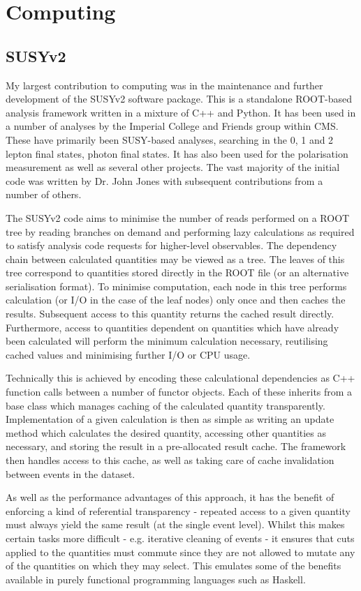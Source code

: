 \chapter{Computing}
\section{SUSYv2}
My largest contribution to computing was in the maintenance and further
development of the \ac{SUSYv2} software package. This is a standalone
\ac{ROOT}-based analysis framework written in a mixture of C++ and Python. It
has been used in a number of analyses by the Imperial College and Friends group
within \ac{CMS}. These have primarily been \ac{SUSY}-based analyses, searching
in the 0, 1 and 2 lepton final states, photon final states. It has also been
used for the \PW polarisation measurement as well as several other projects. The
vast majority of the initial code was written by Dr. John Jones with subsequent
contributions from a number of others.

The \ac{SUSYv2} code aims to minimise the number of reads performed on a
\ac{ROOT} tree by reading branches on demand and performing lazy calculations as
required to satisfy analysis code requests for higher-level observables. The
dependency chain between calculated quantities may be viewed as a tree. The
leaves of this tree correspond to quantities stored directly in the \ac{ROOT}
file (or an alternative serialisation format). To minimise computation, each
node in this tree performs calculation (or I/O in the case of the leaf nodes)
only once and then caches the results. Subsequent access to this quantity
returns the cached result directly. Furthermore, access to quantities dependent
on quantities which have already been calculated will perform the minimum
calculation necessary, reutilising cached values and minimising further I/O or
CPU usage.

Technically this is achieved by encoding these calculational dependencies as C++
function calls between a number of functor objects. Each of these inherits from
a base class which manages caching of the calculated quantity
transparently. Implementation of a given calculation is then as simple as
writing an update method which calculates the desired quantity, accessing other
quantities as necessary, and storing the result in a pre-allocated result
cache. The framework then handles access to this cache, as well as taking care
of cache invalidation between events in the dataset.

As well as the performance advantages of this approach, it has the benefit of
enforcing a kind of referential transparency - repeated access to a given
quantity must always yield the same result (at the single event level). Whilst
this makes certain tasks more difficult - e.g. iterative cleaning of events - it
ensures that cuts applied to the quantities must commute since they are not
allowed to mutate any of the quantities on which they may select. This emulates
some of the benefits available in purely functional programming languages such
as Haskell.
